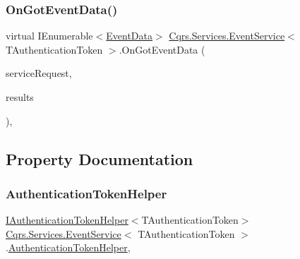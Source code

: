\mbox{\label{classCqrs_1_1Services_1_1EventService_a16030e800b05cea77fd2183db7296804}} 
\subsubsection{\texorpdfstring{On\+Got\+Event\+Data()}{OnGotEventData()}}
{\footnotesize\ttfamily virtual I\+Enumerable$<$\hyperlink{classCqrs_1_1Events_1_1EventData}{Event\+Data}$>$ \hyperlink{classCqrs_1_1Services_1_1EventService}{Cqrs.\+Services.\+Event\+Service}$<$ T\+Authentication\+Token $>$.On\+Got\+Event\+Data (\begin{DoxyParamCaption}\item[{\hyperlink{interfaceCqrs_1_1Services_1_1IServiceRequestWithData}{I\+Service\+Request\+With\+Data}$<$ T\+Authentication\+Token, Guid $>$}]{service\+Request,  }\item[{I\+Enumerable$<$ \hyperlink{classCqrs_1_1Events_1_1EventData}{Event\+Data} $>$}]{results }\end{DoxyParamCaption})\hspace{0.3cm}{\ttfamily [protected]}, {\ttfamily [virtual]}}



\subsection{Property Documentation}
\mbox{\label{classCqrs_1_1Services_1_1EventService_a7da2e2ec8d77d5972cea45a7ad482f39}} 
\subsubsection{\texorpdfstring{Authentication\+Token\+Helper}{AuthenticationTokenHelper}}
{\footnotesize\ttfamily \hyperlink{interfaceCqrs_1_1Authentication_1_1IAuthenticationTokenHelper}{I\+Authentication\+Token\+Helper}$<$T\+Authentication\+Token$>$ \hyperlink{classCqrs_1_1Services_1_1EventService}{Cqrs.\+Services.\+Event\+Service}$<$ T\+Authentication\+Token $>$.\hyperlink{classCqrs_1_1Authentication_1_1AuthenticationTokenHelper}{Authentication\+Token\+Helper}\hspace{0.3cm}{\ttfamily [get]}, {\ttfamily [protected]}}

